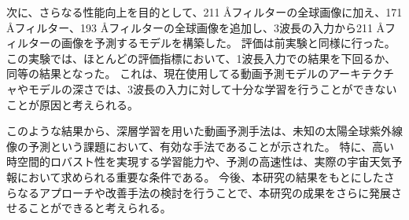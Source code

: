   次に、さらなる性能向上を目的として、211 \AA フィルターの全球画像に加え、171 \AA フィルター、193 \AA フィルターの全球画像を追加し、3波長の入力から211 \AA フィルターの画像を予測するモデルを構築した。
  評価は前実験と同様に行った。
  この実験では、ほとんどの評価指標において、1波長入力での結果を下回るか、同等の結果となった。
  これは、現在使用してる動画予測モデルのアーキテクチャやモデルの深さでは、3波長の入力に対して十分な学習を行うことができないことが原因と考えられる。

  このような結果から、深層学習を用いた動画予測手法は、未知の太陽全球紫外線像の予測という課題において、有効な手法であることが示された。
  特に、高い時空間的ロバスト性を実現する学習能力や、予測の高速性は、実際の宇宙天気予報において求められる重要な条件である。
  今後、本研究の結果をもとにしたさらなるアプローチや改善手法の検討を行うことで、本研究の成果をさらに発展させることができると考えられる。

